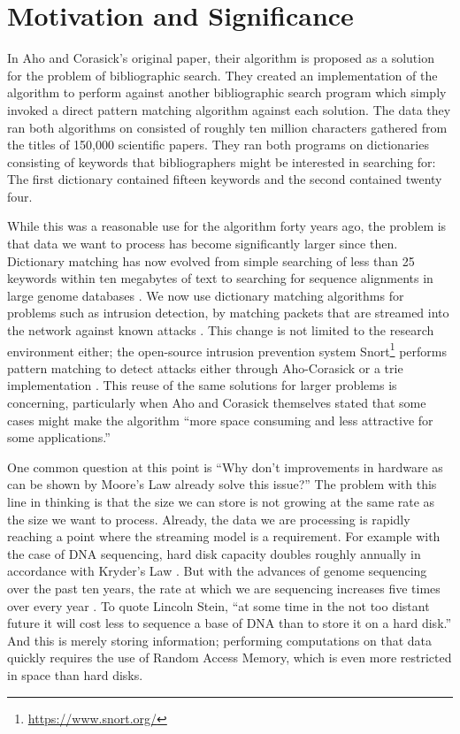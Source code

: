 \documentclass[ %
                    author={Dominic Joseph Moylett},
                    degree={MEng},
                     title={Dictionary Matching with Fingerprints},
                  subtitle={An Empirical Analysis},
                      type={research},
                      year={2015} ]{dissertation}
\begin{document}
\section{Motivation and Significance}

In Aho and Corasick's original paper, their algorithm is proposed as a solution for the problem of bibliographic search. They created an implementation of the algorithm to perform against another bibliographic search program which simply invoked a direct pattern matching algorithm against each solution. The data they ran both algorithms on consisted of roughly ten million characters gathered from the titles of 150,000 scientific papers. They ran both programs on dictionaries consisting of keywords that bibliographers might be interested in searching for: The first dictionary contained fifteen keywords and the second contained twenty four.

While this was a reasonable use for the algorithm forty years ago, the problem is that data we want to process has become significantly larger since then. Dictionary matching has now evolved from simple searching of less than 25 keywords within ten megabytes of text to searching for sequence alignments in large genome databases \cite{15713233}. We now use dictionary matching algorithms for problems such as intrusion detection, by matching packets that are streamed into the network against known attacks \cite{1354682}. This change is not limited to the research environment either; the open-source intrusion prevention system Snort\footnote{\url{https://www.snort.org/}} performs pattern matching to detect attacks either through Aho-Corasick or a trie implementation \cite{website:snort-algo}. This reuse of the same solutions for larger problems is concerning, particularly when Aho and Corasick themselves stated that some cases might make the algorithm ``more space consuming and less attractive for some applications.'' \cite{Aho:1975:ESM:360825.360855}

One common question at this point is ``Why don't improvements in hardware as can be shown by Moore's Law \cite{658762} already solve this issue?'' The problem with this line in thinking is that the size we can store is not growing at the same rate as the size we want to process. Already, the data we are processing is rapidly reaching a point where the streaming model is a requirement. For example with the case of DNA sequencing, hard disk capacity doubles roughly annually in accordance with Kryder's Law \cite{scientificamerican0805-32}. But with the advances of genome sequencing over the past ten years, the rate at which we are sequencing increases five times over every year \cite{20622843}. To quote Lincoln Stein, ``at some time in the not too distant future it will cost less to sequence a base of DNA than to store it on a hard disk.'' \cite{20441614} And this is merely storing information; performing computations on that data quickly requires the use of Random Access Memory, which is even more restricted in space than hard disks.
\end{document}
